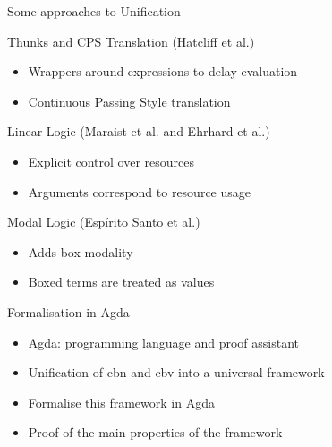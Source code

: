 \documentclass{beamer}
\theoremstyle{definition}
\begin{document}
  \begin{frame}{Some approaches to Unification}

  \begin{block}{\alert{Thunks} and \alert{CPS} Translation (Hatcliff et al.)}
    \begin{itemize}
      \item[\textbullet] Wrappers around expressions to delay evaluation
      \item[\textbullet] Continuous Passing Style translation 
    \end{itemize}
    
  \end{block}\pause

  \begin{block}{\alert{Linear} Logic (Maraist et al. and Ehrhard et al.)}
    \begin{itemize}
      \item[\textbullet] Explicit control over resources
      \item[\textbullet] Arguments correspond to resource usage
    \end{itemize}
  \end{block} \pause

  \begin{block}{\alert{Modal} Logic (Espírito Santo et al.)}
    \begin{itemize}
      \item[\textbullet] Adds box modality
      \item[\textbullet] Boxed terms are treated as values
    \end{itemize}
  \end{block}

  \end{frame}

  \begin{frame}{Formalisation in Agda}
    \begin{itemize}
      \item[\textbullet] \alert{Agda}: programming language and proof assistant
      \item[\textbullet] Unification of \alert{\textsf{cbn}} and \alert{\textsf{cbv}} into a universal framework  
      \item[\textbullet] Formalise this framework in \alert{Agda}
      \item[\textbullet] Proof of the main properties of the framework
    \end{itemize}
  \end{frame}
\end{document}
